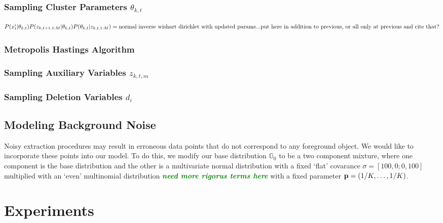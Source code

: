 \documentclass[smallcondensed, final]{svjour3}
\newcommand{\willie}[1]{\textcolor{green}{\textsf{\emph{\textbf{\textcolor{green}{#1}}}}}}
\begin{document}
\subsubsection{Sampling Cluster Parameters $\theta_{k, t}$}
\begin{equation}
P(x_{t}^{i} | \theta_{k,t})  P(z_{k,t+1,1:M} | \theta_{k,t})  P(\theta_{k,t} | z_{k,t,1:M}) = \newline
\text{normal inverse wishart dirichlet with updated params...put here in addition to previous, or all only at previous and cite that?}
\end{equation}


\subsubsection{Metropolis Hastings Algorithm}


\subsubsection{Sampling Auxiliary Variables $z_{k,t,m}$}


\subsubsection{Sampling Deletion Variables $d_{i}$}







\subsection{Modeling Background Noise}

Noisy extraction procedures may result in erroneous data points that do not correspond to any foreground object. We would like to incorporate these points into our model. To do this, we modify our base distribution $\mathbb{G}_{0}$ to be a two component mixture, where one component is the base distribution and the other is a multivariate normal distribution with a fixed `flat' covarance $\sigma = [100, 0; 0, 100]$ multiplied with an `even' multinomial distribution \willie{need more rigorus terms here} with a fixed parameter $\bold{p} = (1/K, \ldots, 1/K)$.








\section{Experiments}
\label{sec:experiments}
\end{document}
